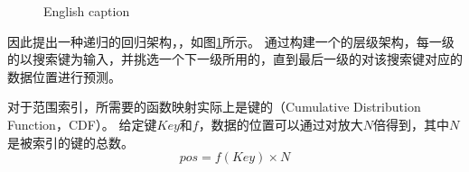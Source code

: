 
\begin{figure}[!htp]
  \centering
    {English caption}
  \label{fig:rmi}
\end{figure}

因此{\li}提出一种递归的回归架构，{\rmi}，如图\ref{fig:rmi}所示。
通过构建一个{\model}的层级架构，每一级的{\model}以搜索键为输入，并挑选一个下一级所用的{\model}，直到最后一级的{\model}对该搜索键对应的数据位置进行预测。


对于范围索引，所需要的函数映射实际上是键的{\cdf}（Cumulative Distribution Function，CDF）。
给定键$Key$和{\cdf}$f$，数据的位置可以通过对{\cdf}放大$N$倍得到，其中$N$是被索引的键的总数。
\[ pos=f(Key) \times N \]


